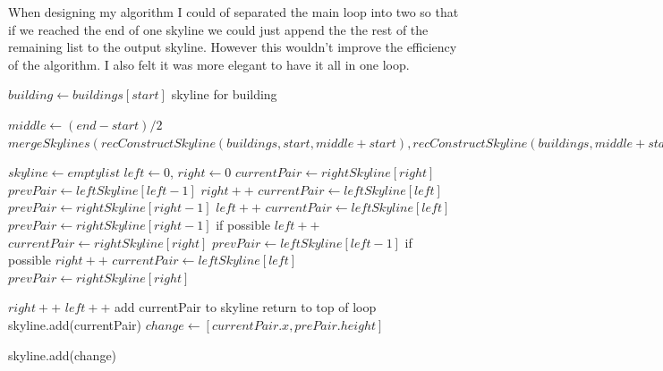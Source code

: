 \documentclass{article}
\begin{document}
		When designing my algorithm I could of separated the main loop into two so that if we reached the end of one skyline we could just append the the rest of the remaining list to the output skyline. However this wouldn't improve the efficiency of the algorithm. I also felt it was more elegant to have it all in one loop.\newline\newline
		
		
	
		\begin{algorithm}
			\begin{algorithmic}[1]
						\State $building \gets buildings[start]$
						\State
						\Return skyline for building
					\EndIf
					
					\State $middle \gets (end - start)/2$
					\State
					\Return $mergeSkylines(recConstructSkyline(buildings, start, middle+start), recConstructSkyline(buildings, middle+start, end))$
				\EndProcedure
				
				\State				
				
					\State $skyline \gets empty list$
					\State
					\State $left \gets 0$, $right \gets 0$
					\State
							\State $currentPair \gets rightSkyline[right]$
							\State $prevPair \gets leftSkyline[left-1]$
							\State $right++$
							\State $currentPair \gets leftSkyline[left]$
							\State $prevPair \gets rightSkyline[right-1]$
							\State $left++$
							\State $currentPair \gets leftSkyline[left]$
							\State $prevPair \gets rightSkyline[right-1]$ if possible
							\State $left++$
																	\State $currentPair \gets rightSkyline[right]$
							\State $prevPair \gets leftSkyline[left-1]$ if possible
							\State $right++$
						\Else
							\State $currentPair \gets leftSkyline[left]$
							\State $prevPair \gets rightSkyline[right]$
							
							\State $right++$
							\State $left++$
						\EndIf
						\State
							\State add currentPair to skyline
							\State return to top of loop
							\State skyline.add(currentPair)
						\Else
							\State $change \gets [currentPair.x, prePair.height]$
							
								\State skyline.add(change)
							\EndIf
						\EndIf  
					\EndWhile
				\EndProcedure
			\end{algorithmic}
		
		\end{algorithm}
		
\end{document}
